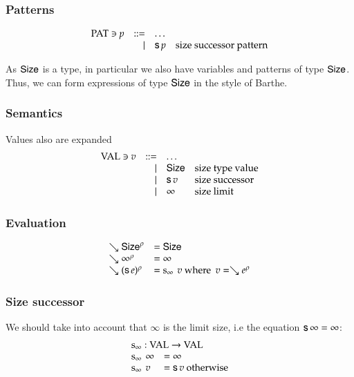 \subsubsection{Patterns}
\[
\begin{array}{lrll}
\operatorname{PAT} \ni p & ::= & \ldots & \\
& \mid & \mathsf{s}\, p & \mbox{size successor pattern}\\
\end{array}
\]


As $\mathsf{Size}$ is a type, in particular we also have variables and patterns of type $\mathsf{Size}$.
Thus, we can form expressions of type $\mathsf{Size}$ in the style of Barthe.

\subsubsection{Semantics}

Values also are expanded
\[
\begin{array}{lrll}
\operatorname{VAL} \ni v & ::= & \ldots & \\
& \mid & \mathsf{Size} & \mbox{size type value}\\
& \mid & \mathsf{s}\, v & \mbox{size successor}\\
& \mid & \infty & \mbox{size limit}\\
\end{array}
\]

\subsubsection{Evaluation}

\[
\begin{array}{ll}
\searrow \mathsf{Size}^{\rho} & = \mathsf{Size} \\
\searrow \infty^{\rho} & = \infty  \\
\searrow (\mathsf{s}\, e)^{\rho} & = \operatorname{s_{\infty}} \: v \mbox{ where } \: v = \searrow e^{\rho} \\ 
\end{array}
\]

\subsubsection{Size successor}
We should take into account that $\infty$ is the limit size, i.e the equation $\mathsf{s}\, \infty = \infty$:
\[
\begin{array}[t]{ll}
\multicolumn{2}{l}{\sinfty : \Val \ra \Val}\\ 
\sinfty \: \infty & = \infty\\
\sinfty \:  v & = \s v  \mbox{ otherwise}\\ 
\end{array}
\]


